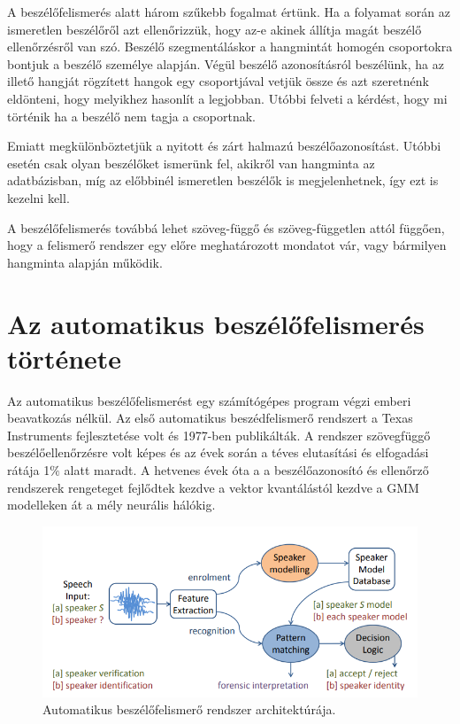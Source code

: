 A beszélőfelismerés alatt három szűkebb fogalmat értünk. Ha a folyamat során az ismeretlen beszélőről azt ellenőrizzük, hogy az-e akinek állítja magát beszélő ellenőrzésről van szó. Beszélő szegmentáláskor a hangmintát homogén csoportokra bontjuk a beszélő személye alapján. Végül beszélő azonosításról beszélünk, ha az illető hangját rögzített hangok egy csoportjával vetjük össze és azt szeretnénk eldönteni, hogy melyikhez hasonlít a legjobban. Utóbbi felveti a kérdést, hogy mi történik ha a beszélő nem tagja a csoportnak. 

Emiatt megkülönböztetjük a nyitott és zárt halmazú beszélőazonosítást. Utóbbi esetén csak olyan beszélőket ismerünk fel, akikről van hangminta az adatbázisban, míg az előbbinél ismeretlen beszélők is megjelenhetnek, így ezt is kezelni kell.

A beszélőfelismerés továbbá lehet szöveg-függő és szöveg-független attól függően, hogy a felismerő rendszer egy előre meghatározott mondatot vár, vagy bármilyen hangminta alapján működik.

\section{Az automatikus beszélőfelismerés története}

Az automatikus beszélőfelismerést egy számítógépes program végzi emberi beavatkozás nélkül. Az első automatikus beszédfelismerő rendszert a Texas Instruments fejlesztetése volt és 1977-ben publikálták. A rendszer szövegfüggő beszélőellenőrzésre volt képes és az évek során a téves elutasítási és elfogadási rátája 1$\%$ alatt maradt. A hetvenes évek óta a a beszélőazonosító és ellenőrző rendszerek rengeteget fejlődtek kezdve a vektor kvantálástól kezdve a GMM modelleken át a mély neurális hálókig. 

\begin{figure}[!ht]
	\centering
	\includegraphics[width=150mm, keepaspectratio]{figures/automatic_speaker_recognition.png}
	\caption{Automatikus beszélőfelismerő rendszer architektúrája.}
	\label{fig:automatic_speaker_recognition}
\end{figure}

